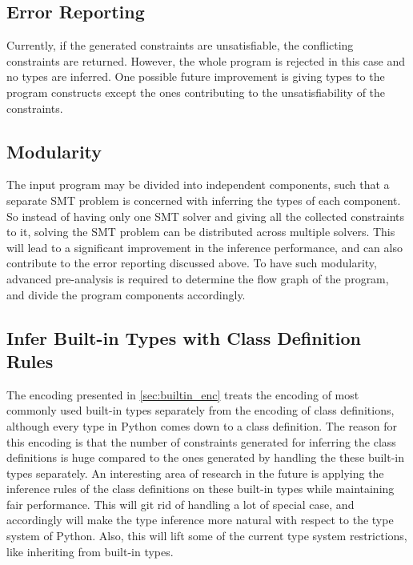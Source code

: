 \subsection{Error Reporting}
Currently, if the generated constraints are unsatisfiable, the conflicting constraints are returned. However, the whole program is rejected in this case and no types are inferred. One possible future improvement is giving types to the program constructs except the ones contributing to the unsatisfiability of the constraints.
\subsection{Modularity}
The input program may be divided into independent components, such that a separate SMT problem is concerned with inferring the types of each component. So instead of having only one SMT solver and giving all the collected constraints to it, solving the SMT problem can be distributed across multiple solvers. This will lead to a significant improvement in the inference performance, and can also contribute to the error reporting discussed above. To have such modularity, advanced pre-analysis is required to determine the flow graph of the program, and divide the program components accordingly.
\subsection{Infer Built-in Types with Class Definition Rules}
The encoding presented in \ref{sec:builtin_enc} treats the encoding of most commonly used built-in types separately from the encoding of class definitions, although every type in Python comes down to a class definition. The reason for this encoding is that the number of constraints generated for inferring the class definitions is huge compared to the ones generated by handling the these built-in types separately. An interesting area of research in the future is applying the inference rules of the class definitions on these built-in types while maintaining fair performance. This will git rid of handling a lot of special case, and accordingly will make the type inference more natural with respect to the type system of Python. Also, this will lift some of the current type system restrictions, like inheriting from built-in types.
